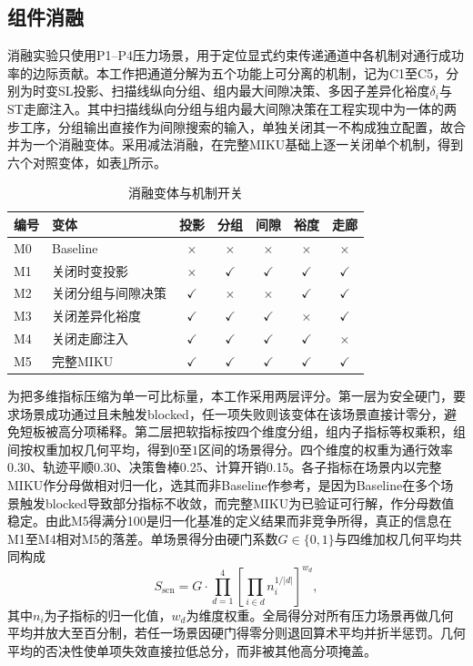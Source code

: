 \documentclass[a4paper,11pt]{ctexart}
\theoremstyle{definition}
\begin{document}
\subsection{组件消融}
\label{subsec:exp_ablation}

消融实验只使用P1--P4压力场景，用于定位显式约束传递通道中各机制对通行成功率的边际贡献。本工作把通道分解为五个功能上可分离的机制，记为C1至C5，分别为时变SL投影、扫描线纵向分组、组内最大间隙决策、多因子差异化裕度$\delta_i$与ST走廊注入。其中扫描线纵向分组与组内最大间隙决策在工程实现中为一体的两步工序，分组输出直接作为间隙搜索的输入，单独关闭其一不构成独立配置，故合并为一个消融变体。采用减法消融，在完整MIKU基础上逐一关闭单个机制，得到六个对照变体，如表\ref{tab:exp_ablation_matrix}所示。

\begin{table}[htbp]
\centering
\caption{消融变体与机制开关}
\label{tab:exp_ablation_matrix}
\small
\begin{tabular}{llccccc}
\toprule
\textbf{编号} & \textbf{变体} & 投影 & 分组 & 间隙 & 裕度 & 走廊 \\
\midrule
M0 & Baseline             & $\times$    & $\times$    & $\times$    & $\times$    & $\times$    \\
M1 & 关闭时变投影         & $\times$    & $\checkmark$ & $\checkmark$ & $\checkmark$ & $\checkmark$ \\
M2 & 关闭分组与间隙决策   & $\checkmark$ & $\times$    & $\times$    & $\checkmark$ & $\checkmark$ \\
M3 & 关闭差异化裕度       & $\checkmark$ & $\checkmark$ & $\checkmark$ & $\times$    & $\checkmark$ \\
M4 & 关闭走廊注入         & $\checkmark$ & $\checkmark$ & $\checkmark$ & $\checkmark$ & $\times$    \\
M5 & 完整MIKU             & $\checkmark$ & $\checkmark$ & $\checkmark$ & $\checkmark$ & $\checkmark$ \\
\bottomrule
\end{tabular}
\end{table}

为把多维指标压缩为单一可比标量，本工作采用两层评分。第一层为安全硬门，要求场景成功通过且未触发blocked，任一项失败则该变体在该场景直接计零分，避免短板被高分项稀释。第二层把软指标按四个维度分组，组内子指标等权乘积，组间按权重加权几何平均，得到$0$至$1$区间的场景得分。四个维度的权重为通行效率0.30、轨迹平顺0.30、决策鲁棒0.25、计算开销0.15。各子指标在场景内以完整MIKU作分母做相对归一化，选其而非Baseline作参考，是因为Baseline在多个场景触发blocked导致部分指标不收敛，而完整MIKU为已验证可行解，作分母数值稳定。由此M5得满分100是归一化基准的定义结果而非竞争所得，真正的信息在M1至M4相对M5的落差。单场景得分由硬门系数$G \in \{0, 1\}$与四维加权几何平均共同构成
\begin{equation}
S_{\mathrm{scn}} = G \cdot \prod_{d=1}^{4} \left[ \prod_{i \in d} n_i^{1/|d|} \right]^{w_d},
\label{eq:exp_score_scn}
\end{equation}
其中$n_i$为子指标的归一化值，$w_d$为维度权重。全局得分对所有压力场景再做几何平均并放大至百分制，若任一场景因硬门得零分则退回算术平均并折半惩罚。几何平均的否决性使单项失效直接拉低总分，而非被其他高分项掩盖。
\end{document}
